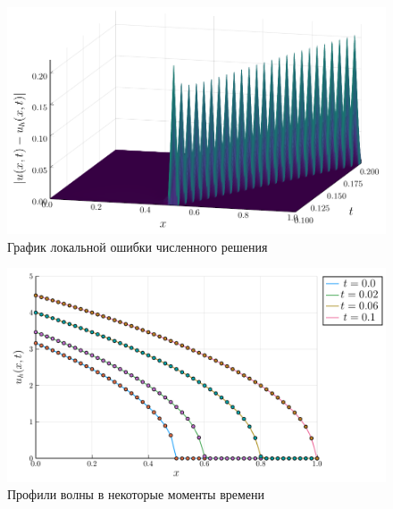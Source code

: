\begin{figure}
    \centering
    \includegraphics[width=\textwidth]{Разностные_схемы_на_статических_сетках/Программный_код_примеры_расчётов/explicit_scheme/problem_2_implicit_error_surface.pdf}
    \caption{График локальной ошибки численного решения}
    \label{fig:problem_2_implicit_error_surface}
\end{figure}
\begin{figure}
    \centering
    \includegraphics{Разностные_схемы_на_статических_сетках/Программный_код_примеры_расчётов/explicit_scheme/problem_2_implicit_Samarski.pdf}
    \caption{Профили волны в некоторые моменты времени}
    \label{fig:problem_2_implicit_Samarski}
\end{figure}
